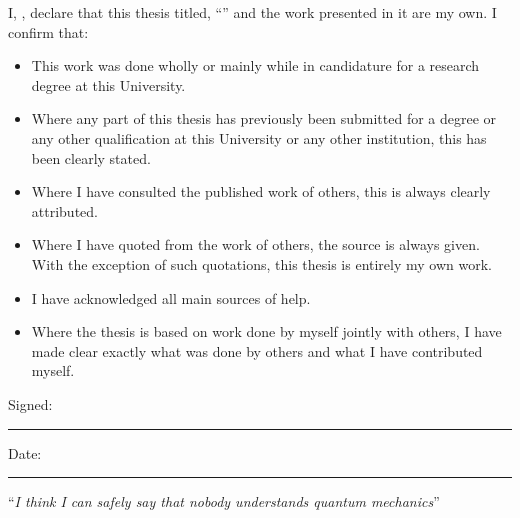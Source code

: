 \documentclass[
12pt, %
oneside, %
english, %
onehalfspacing, %
headsepline, %
]{Structural} %
\begin{document}

\begin{declaration}
\addchaptertocentry{\authorshipname} %
\noindent I, \authorname, declare that this thesis titled, \enquote{\ttitle} and the work presented in it are my own. I confirm that:

\begin{itemize} 
\item This work was done wholly or mainly while in candidature for a research degree at this University.
\item Where any part of this thesis has previously been submitted for a degree or any other qualification at this University or any other institution, this has been clearly stated.
\item Where I have consulted the published work of others, this is always clearly attributed.
\item Where I have quoted from the work of others, the source is always given. With the exception of such quotations, this thesis is entirely my own work.
\item I have acknowledged all main sources of help.
\item Where the thesis is based on work done by myself jointly with others, I have made clear exactly what was done by others and what I have contributed myself.\\
\end{itemize}
 
\noindent Signed:\\
\rule[0.5em]{25em}{0.5pt} %
 
\noindent Date:\\
\rule[0.5em]{25em}{0.5pt} %
\end{declaration}

\cleardoublepage


\vspace*{0.2\textheight}

\noindent\enquote{\itshape I think I can safely say that nobody understands quantum mechanics}\bigbreak
\end{document}
